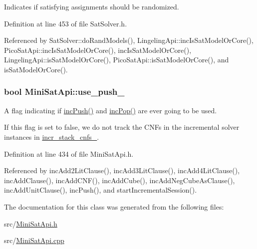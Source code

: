 Indicates if satisfying assignments should be randomized. 



Definition at line 453 of file Sat\-Solver.\-h.



Referenced by Sat\-Solver\-::do\-Rand\-Models(), Lingeling\-Api\-::inc\-Is\-Sat\-Model\-Or\-Core(), Pico\-Sat\-Api\-::inc\-Is\-Sat\-Model\-Or\-Core(), inc\-Is\-Sat\-Model\-Or\-Core(), Lingeling\-Api\-::is\-Sat\-Model\-Or\-Core(), Pico\-Sat\-Api\-::is\-Sat\-Model\-Or\-Core(), and is\-Sat\-Model\-Or\-Core().

\hypertarget{classMiniSatApi_a9d1530348f713264a41d6115e4cfb62e}{
\subsubsection[{use\-\_\-push\-\_\-}]{\setlength{\rightskip}{0pt plus 5cm}bool Mini\-Sat\-Api\-::use\-\_\-push\-\_\-\hspace{0.3cm}{\ttfamily [protected]}}}\label{classMiniSatApi_a9d1530348f713264a41d6115e4cfb62e}


A flag indicating if \hyperlink{classMiniSatApi_a27013ace25320f68252bef5ba9f2e9ad}{inc\-Push()} and \hyperlink{classMiniSatApi_af388f97db15f77baeb420a8fef74ca6a}{inc\-Pop()} are ever going to be used. 

If this flag is set to false, we do not track the C\-N\-Fs in the incremental solver instances in \hyperlink{classMiniSatApi_aca2da2d02879e4a05c09124ff84cc4cd}{incr\-\_\-stack\-\_\-cnfs\-\_\-}. 

Definition at line 434 of file Mini\-Sat\-Api.\-h.



Referenced by inc\-Add2\-Lit\-Clause(), inc\-Add3\-Lit\-Clause(), inc\-Add4\-Lit\-Clause(), inc\-Add\-Clause(), inc\-Add\-C\-N\-F(), inc\-Add\-Cube(), inc\-Add\-Neg\-Cube\-As\-Clause(), inc\-Add\-Unit\-Clause(), inc\-Push(), and start\-Incremental\-Session().



The documentation for this class was generated from the following files\-:\begin{DoxyCompactItemize}
\item 
src/\hyperlink{MiniSatApi_8h}{Mini\-Sat\-Api.\-h}\item 
src/\hyperlink{MiniSatApi_8cpp}{Mini\-Sat\-Api.\-cpp}\end{DoxyCompactItemize}
